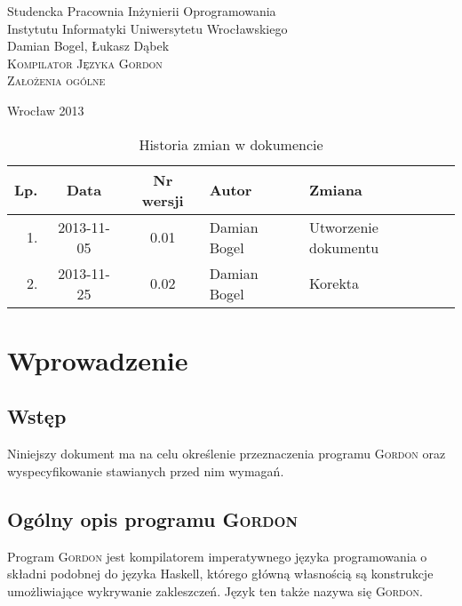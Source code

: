 \documentclass{documentation}
\begin{document}
\begin{titlepage}
\begin{center}
Studencka Pracownia Inżynierii Oprogramowania\\
Instytutu Informatyki Uniwersytetu Wrocławskiego\\[6cm]

Damian Bogel, Łukasz Dąbek\\[1cm]
\textsc{\LARGE Kompilator Języka Gordon}\\[0.5cm]
\textsc{\large Założenia ogólne}

\vfill
Wrocław 2013 \\[2.5cm]

\end{center}
\end{titlepage}

\newpage
\begin{table}
	\centering
    \captionsetup{name=Tabela}
	\caption{Historia zmian w dokumencie}
		\begin{tabular}{|r|c|c|l|l|}
		\hline
		Lp.  & Data       & Nr wersji & Autor                 & Zmiana \\ \hline
		1.   & 2013-11-05 & 0.01 & Damian Bogel & Utworzenie dokumentu \\ \hline
		2.   & 2013-11-25 & 0.02 & Damian Bogel & Korekta \\ \hline
	\end{tabular}
\end{table}
\newpage

\tableofcontents
\setcounter{page}{2}

\newpage

\section{Wprowadzenie}
\subsection{Wstęp}
\noindent Niniejszy dokument ma na celu określenie przeznaczenia programu
\textsc{Gordon} oraz wyspecyfikowanie stawianych przed nim wymagań.

\subsection{Ogólny opis programu \textsc{Gordon}}
\noindent Program \textsc{Gordon} jest kompilatorem imperatywnego języka
programowania o składni podobnej do języka Haskell, którego główną własnością
są konstrukcje umożliwiające wykrywanie zakleszczeń. Język ten także nazywa się
\textsc{Gordon}.
\end{document}
